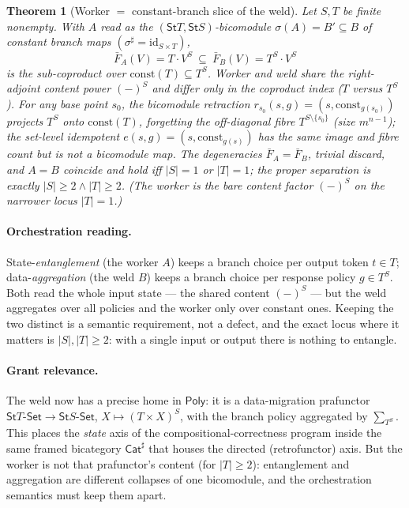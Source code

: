 \documentclass[11pt]{article}
\newcommand{\Set}{\mathsf{Set}}
\newcommand{\Poly}{\mathsf{Poly}}
\newcommand{\Cat}{\mathsf{Cat}^{\sharp}}
\newcommand{\St}{\mathsf{St}}                      %
\newcommand{\bk}[1]{{#1}^{\sharp}}                 %
\newcommand{\const}{\mathrm{const}}
\theoremstyle{plain}
\newtheorem{theorem}{Theorem}
\theoremstyle{definition}
\theoremstyle{remark}
\begin{document}
\begin{theorem}[Worker $=$ constant-branch slice of the weld]\label{thm:unified}
Let $S,T$ be finite nonempty. With $A$ read as the $(\St T,\St S)$-bicomodule
$\sigma(A)=B'\subseteq B$ of constant branch maps $(\bk\sigma=\mathrm{id}_{S\times T})$,
\[
  \bar F_A(V)=T\cdot V^S \ \subseteq\ \bar F_B(V)=T^S\cdot V^S
\]
is the sub-coproduct over $\const(T)\subseteq T^S$. Worker and weld \emph{share} the
right-adjoint content power $(-)^S$ and differ \emph{only} in the coproduct index ($T$
versus $T^S$). For any base point $s_0$, the bicomodule retraction
$r_{s_0}(s,g)=(s,\const_{g(s_0)})$ projects $T^S$ onto $\const(T)$, forgetting the
off-diagonal fibre $T^{S\setminus\{s_0\}}$ (size $m^{n-1}$); the set-level idempotent
$e(s,g)=(s,\const_{g(s)})$ has the same image and fibre count but is not a bicomodule map.
The degeneracies $\bar F_A=\bar F_B$, trivial discard, and $A=B$ coincide and hold \emph{iff
$|S|=1$ or $|T|=1$}; the proper separation is exactly $|S|\ge2\wedge|T|\ge2$. (The worker is
the bare content factor $(-)^S$ on the narrower locus $|T|=1$.)
\end{theorem}

\paragraph{Orchestration reading.}
State-\emph{entanglement} (the worker $A$) keeps a branch choice per output token $t\in T$;
data-\emph{aggregation} (the weld $B$) keeps a branch choice per response policy $g\in
T^S$. Both read the whole input state --- the shared content $(-)^S$ --- but the weld
aggregates over all policies and the worker only over constant ones. Keeping the two
distinct is a semantic requirement, not a defect, and the exact locus where it matters is
$|S|,|T|\ge2$: with a single input or output there is nothing to entangle.

\paragraph{Grant relevance.}
The weld now has a precise home in $\Poly$: it is a data-migration prafunctor
$\St T\text{-}\Set\to\St S\text{-}\Set$, $X\mapsto(T\times X)^S$, with the branch policy
aggregated by $\sum_{T^S}$. This places the \emph{state} axis of the
compositional-correctness program inside the same framed bicategory $\Cat$ that houses the
directed (retrofunctor) axis. But the worker is not that prafunctor's content (for $|T|\ge2$): entanglement
and aggregation are different collapses of one bicomodule, and the orchestration semantics
must keep them apart.
\end{document}
